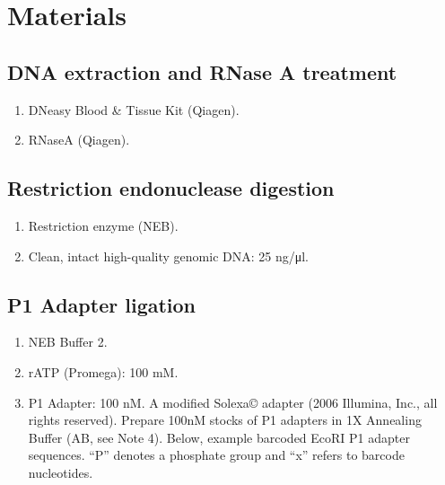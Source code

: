 \documentclass[
  letterpaper,
  DIV=11,
  numbers=noendperiod]{scrreprt}
\providecommand{\tightlist}{%
  \setlength{\itemsep}{0pt}\setlength{\parskip}{0pt}}\usepackage{longtable,booktabs,array}
\begin{document}
\hypertarget{materials-23}{%
\section{Materials}\label{materials-23}}

\hypertarget{dna-extraction-and-rnase-a-treatment}{%
\subsection{DNA extraction and RNase A
treatment}\label{dna-extraction-and-rnase-a-treatment}}

\begin{enumerate}
\def\labelenumi{\arabic{enumi}.}
\tightlist
\item
  DNeasy Blood \& Tissue Kit (Qiagen).
\item
  RNaseA (Qiagen).
\end{enumerate}

\hypertarget{restriction-endonuclease-digestion}{%
\subsection{Restriction endonuclease
digestion}\label{restriction-endonuclease-digestion}}

\begin{enumerate}
\def\labelenumi{\arabic{enumi}.}
\tightlist
\item
  Restriction enzyme (NEB).
\item
  Clean, intact high-quality genomic DNA: 25 ng/μl.
\end{enumerate}

\hypertarget{p1-adapter-ligation}{%
\subsection{P1 Adapter ligation}\label{p1-adapter-ligation}}

\begin{enumerate}
\def\labelenumi{\arabic{enumi}.}
\item
  NEB Buffer 2.
\item
  rATP (Promega): 100 mM.
\item
  P1 Adapter: 100 nM. A modified Solexa© adapter (2006 Illumina, Inc.,
  all rights reserved). Prepare 100nM stocks of P1 adapters in 1X
  Annealing Buffer (AB, see Note 4). Below, example barcoded EcoRI P1
  adapter sequences. ``P'' denotes a phosphate group and ``x'' refers to
  barcode nucleotides.
\end{enumerate}
\end{document}
